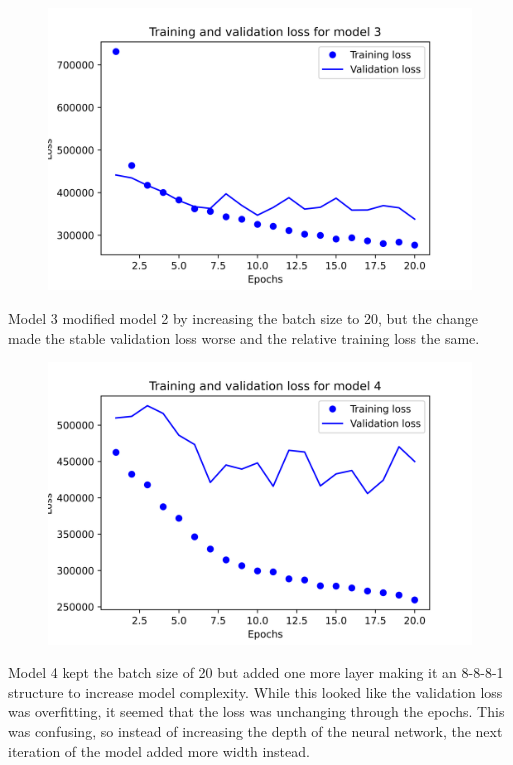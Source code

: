\documentclass{article}
\begin{document}
    \begin{figure}[H]
        \includegraphics[width=\linewidth]{images/model3.png}
    \end{figure}
    Model 3 modified model 2 by increasing the batch size to 20, but the change made the stable validation loss worse and the relative 
    training loss the same.

    \begin{figure}[H]
        \includegraphics[width=\linewidth]{images/model4.png}
    \end{figure}
    Model 4 kept the batch size of 20 but added one more layer making it an 8-8-8-1 structure to increase model complexity. 
    While this looked like the validation loss was overfitting, it seemed that the loss was unchanging through the epochs. 
    This was confusing, so instead of increasing the depth of the neural network, the next iteration of the model added 
    more width instead.
\end{document}
